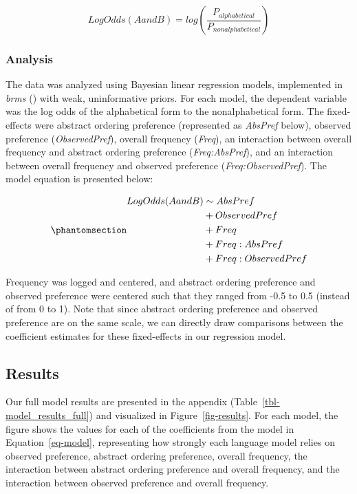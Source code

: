 \documentclass[
  12pt,
  letterpaper,
]{scrreprt}
\begin{document}
\[
LogOdds(AandB) = log(\frac{P_{alphabetical}}{P_{nonalphabetical}})
\]

\subsubsection{Analysis}\label{analysis-2}

The data was analyzed using Bayesian linear regression models,
implemented in \emph{brms}
() with
weak, uninformative priors. For each model, the dependent variable was
the log odds of the alphabetical form to the nonalphabetical form. The
fixed-effects were abstract ordering preference (represented as
\emph{AbsPref} below), observed preference (\emph{ObservedPref}),
overall frequency (\emph{Freq}), an interaction between overall
frequency and abstract ordering preference (\emph{Freq:AbsPref}), and an
interaction between overall frequency and observed preference
(\emph{Freq:ObservedPref}). The model equation is presented below:

\begin{equation}\phantomsection\label{eq-model}{
\begin{aligned}
    LogOdds(AandB) & \sim AbsPref \\
      & + ObservedPref\\
      & + Freq\\
      & + Freq:AbsPref\\ 
      & + Freq:ObservedPref
\end{aligned}
}\end{equation}

\noindent Frequency was logged and centered, and abstract ordering
preference and observed preference were centered such that they ranged
from -0.5 to 0.5 (instead of from 0 to 1). Note that since abstract
ordering preference and observed preference are on the same scale, we
can directly draw comparisons between the coefficient estimates for
these fixed-effects in our regression model.

\subsection{Results}\label{results-5}

Our full model results are presented in the appendix
(Table~\ref{tbl-model_results_full}) and visualized in
Figure~\ref{fig-results}. For each model, the figure shows the values
for each of the coefficients from the model in Equation~\ref{eq-model},
representing how strongly each language model relies on observed
preference, abstract ordering preference, overall frequency, the
interaction between abstract ordering preference and overall frequency,
and the interaction between observed preference and overall frequency.
\end{document}
